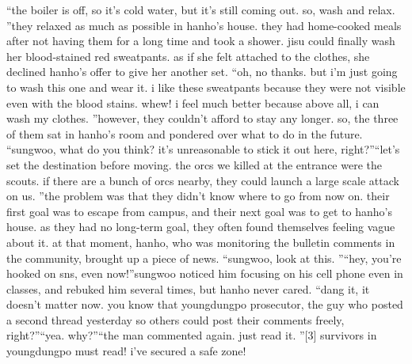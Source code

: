 “the boiler is off, so it’s cold water, but it’s still coming out.
 so, wash and relax.
”they relaxed as much as possible in hanho’s house.
 they had home-cooked meals after not having them for a long time and took a shower.
 jisu could finally wash her blood-stained red sweatpants.
 as if she felt attached to the clothes, she declined hanho’s offer to give her another set.
“oh, no thanks.
 but i’m just going to wash this one and wear it.
 i like these sweatpants because they were not visible even with the blood stains.
 whew! i feel much better because above all, i can wash my clothes.
”however, they couldn’t afford to stay any longer.
 so, the three of them sat in hanho’s room and pondered over what to do in the future.
“sungwoo, what do you think? it’s unreasonable to stick it out here, right?”“let’s set the destination before moving.
 the orcs we killed at the entrance were the scouts.
 if there are a bunch of orcs nearby, they could launch a large scale attack on us.
”the problem was that they didn’t know where to go from now on.
their first goal was to escape from campus, and their next goal was to get to hanho’s house.
as they had no long-term goal, they often found themselves feeling vague about it.
at that moment, hanho, who was monitoring the bulletin comments in the community, brought up a piece of news.
“sungwoo, look at this.
”“hey, you’re hooked on sns, even now!”sungwoo noticed him focusing on his cell phone even in classes, and rebuked him several times, but hanho never cared.
“dang it, it doesn’t matter now.
 you know that youngdungpo prosecutor, the guy who posted a second thread yesterday so others could post their comments freely, right?”“yea.
 why?”“the man commented again.
 just read it.
”[3] survivors in youngdungpo must read! i’ve secured a safe zone!

